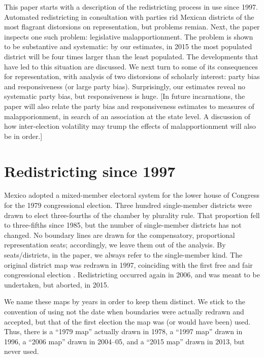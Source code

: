 \documentclass[letter,12pt]{article}
\begin{document}
This paper starts with a description of the redistricting process in use since 1997. Automated redistricting in consultation with parties rid Mexican districts of the most flagrant distorsions on representation, but problems remian. Next, the paper inspects one such problem: legislative malapportionment. The problem is shown to be substantive and systematic: by our estimates, in 2015 the most populated district will be four times larger than the least populated. The developments that have led to this situation are discussed. We next turn to some of its consequences for representation, with analysis of two distorsions of scholarly interest: party bias and responsiveness (or large party bias). Surprisingly, our estimates reveal no systematic party bias, but responsiveness is huge. [In future incarnations, the paper will also relate the party bias and responsiveness estimates to measures of malapporionment, in search of an association at the state level. A discussion of how inter-election volatility may trump the effects of malapportionment will also be in order.]

\section{Redistricting since 1997}

Mexico adopted a mixed-member electoral system for the lower house of Congress for the 1979 congressional election. Three hundred single-member districts were drawn to elect three-fourths of the chamber by plurality rule. That proportion fell to three-fifths since 1985, but the number of single-member districts has not changed. No boundary lines are drawn for the compensatory, proportional representation seats; accordingly, we leave them out of the analysis. By seats/districts, in the paper, we always refer to the single-member kind. The original district map was redrawn in 1997, coinciding with the first free and fair congressional election \citep{lujambio.vives.2008}. Redistricting occurred again in 2006, and was meant to be undertaken, but aborted, in 2015. 

We name these maps by years in order to keep them distinct. We stick to the convention of using not the date when boundaries were actually redrawn and accepted, but that of the first election the map was (or would have been) used. Thus, there is a ``1979 map'' actually drawn in 1978, a ``1997 map'' drawn in 1996, a ``2006 map'' drawn in 2004--05, and a ``2015 map'' drawn in 2013, but never used.
\end{document}
